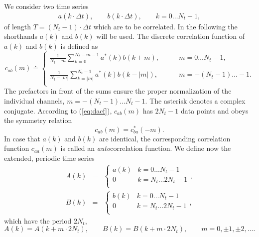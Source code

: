 \documentclass[a4paper,11pt]{article}
\begin{document}
\begin{appendices}
We consider two time series
\begin{eqnarray}
a(k\cdot\Delta t),\qquad b(k\cdot\Delta t), \qquad k = 0\ldots N_t-1,
\end{eqnarray}
of length $T = (N_t-1)\cdot\Delta t$ which are to be correlated. In the
following the shorthands $a(k)$ and $b(k)$ will be used. The discrete
correlation function of $a(k)$ and $b(k)$ is defined as
\begin{equation}
\label{eq:dacf}
c_{ab}(m) \doteq \left\{
\begin{array}{ll}
\frac{1}{N_t - m}\sum\limits_{k=0}^{N_t-m-1}a^*(k)b(k+m),
                 \qquad &m= 0\ldots N_t-1,\\
&\\
\frac{1}{N_t - |m|}\sum\limits_{k=|m|}^{N_t-1}a^*(k)b(k-|m|),
                 \qquad &m= -(N_t-1)\ldots -1.\\
\end{array} \right.
\end{equation}
The prefactors in front of the sums ensure the proper normalization of
the individual channels, $m = -(N_t-1)\ldots N_t-1$.  The asterisk
denotes a complex conjugate. According to (\ref{eq:dacf}),
$c_{ab}(m)$ has $2N_t - 1$ data points and obeys the symmetry relation
\begin{equation}
c_{ab}(m) = c^*_{ba}(-m).
\end{equation}
In case that $a(k)$ and $b(k)$ are identical, the corresponding
correlation function $c_{aa}(m)$ is called an \textit{auto}correlation
function. We define now the extended, periodic time series
\begin{eqnarray}
\label{eq:a}
A(k) &= &\left\{\begin{array}{ll}
                a(k) &k = 0\ldots N_t-1\\
                0    &k = N_t \ldots 2N_t-1\\
                \end{array}\right.,\\
\label{eq:b}
B(k) &= &\left\{\begin{array}{ll}
                b(k) &k = 0\ldots N_t-1\\
                0    &k = N_t \ldots 2N_t-1\\
                \end{array}\right.,
\end{eqnarray}
which have the period $2N_t$,
\begin{equation}
A(k) = A(k + m\cdot 2N_t),\qquad
B(k) = B(k + m\cdot 2N_t),\qquad m = 0,\pm 1,\pm 2,\ldots.

\end{equation}
\end{appendices}
\end{document}
